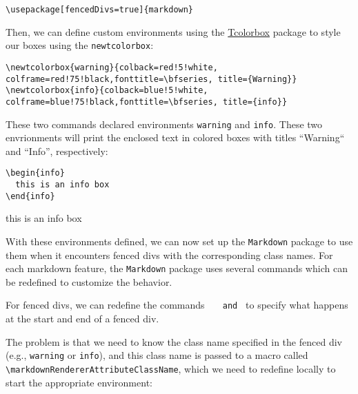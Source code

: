 \documentclass[]{article}
\def\fenceddivclass#1{
  \begin{#1}
  \def\endfence{\end{#1}}
}
\def\markdownRendererFencedDivAttributeContextBegin{
  \begingroup
  \let\markdownRendererAttributeClassName\fenceddivclass
  \def\endfence{}
}
\def\markdownRendererFencedDivAttributeContextEnd{\endfence\endgroup}
\begin{document}
\begin{verbatim}
\usepackage[fencedDivs=true]{markdown}
\end{verbatim}

Then, we can define custom environments using the \href{https://ctan.org/pkg/tcolorbox?lang=en}{Tcolorbox} package to style our boxes using the \Verb|newtcolorbox|:

\begin{verbatim}
\newtcolorbox{warning}{colback=red!5!white, colframe=red!75!black,fonttitle=\bfseries, title={Warning}}
\newtcolorbox{info}{colback=blue!5!white, colframe=blue!75!black,fonttitle=\bfseries, title={info}}
\end{verbatim}

These two commands declared environments \texttt{warning} and \texttt{info}. These two envrionments will print the enclosed text
in colored boxes with titles ``Warning`` and ``Info'', respectively:

\begin{verbatim}
\begin{info}
  this is an info box
\end{info}
\end{verbatim}

\begin{info}
  this is an info box
\end{info}


With these environments defined, we can now set up the \texttt{Markdown}
package to use them when it encounters fenced divs with the corresponding class
names. For each markdown feature, the \texttt{Markdown} package uses several commands
which can be redefined to customize the behavior. 

For fenced divs, we can redefine
the commands \texttt{\markdownRendererFencedDivAttributeContextBegin} and
\texttt{\markdownRendererFencedDivAttributeContextEnd}
to specify what happens at the start and end of a fenced div.

The problem is that we need to know the class name specified in the fenced div (e.g., \texttt{warning} or \texttt{info}),
and this class name is passed to a macro called \Verb|\markdownRendererAttributeClassName|, which we need to redefine 
locally to start the appropriate environment:
\end{document}
